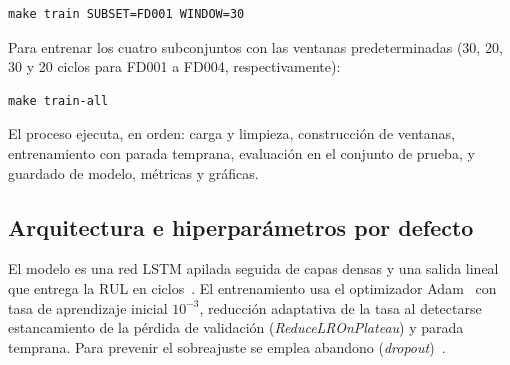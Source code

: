 \documentclass[letterpaper]{article}
\begin{document}
\begin{lstlisting}
make train SUBSET=FD001 WINDOW=30
\end{lstlisting}

Para entrenar los cuatro subconjuntos con las ventanas predeterminadas
(30, 20, 30 y 20 ciclos para FD001 a FD004, respectivamente):

\begin{lstlisting}
make train-all
\end{lstlisting}

El proceso ejecuta, en orden: carga y limpieza, construcción de ventanas,
entrenamiento con parada temprana, evaluación en el conjunto de prueba, y
guardado de modelo, métricas y gráficas.

\subsection{Arquitectura e hiperparámetros por defecto}

El modelo es una red LSTM apilada seguida de capas densas y una salida lineal que
entrega la RUL en ciclos~\cite{zheng2017lstm,hochreiter1997lstm}. El
entrenamiento usa el optimizador Adam~\cite{kingma2015adam} con tasa de
aprendizaje inicial $10^{-3}$, reducción adaptativa de la tasa al detectarse
estancamiento de la pérdida de validación (\textit{ReduceLROnPlateau}) y parada
temprana. Para prevenir el sobreajuste se emplea abandono
(\textit{dropout})~\cite{srivastava2014dropout}.
\end{document}
